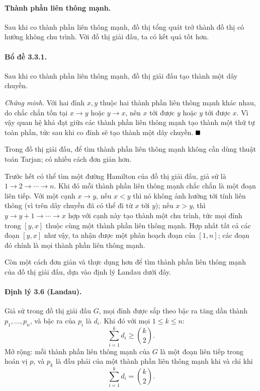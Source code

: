 \documentclass[11pt]{article}
\providecommand{\square}{\mathord{\vcenter{\hrule height .6em width .6em}}}
\begin{document}
\paragraph{Thành phần liên thông mạnh.}
Sau khi co thành phần liên thông mạnh, đồ thị tổng quát trở thành đồ thị có
hướng không chu trình. Với đồ thị giải đấu, ta có kết quả tốt hơn.

\paragraph{Bổ đề 3.3.1.}
Sau khi co thành phần liên thông mạnh, đồ thị giải đấu tạo thành một dây chuyền.

\emph{Chứng minh.}
Với hai đỉnh $x,y$ thuộc hai thành phần liên thông mạnh khác nhau, do chắc chắn
tồn tại $x\to y$ hoặc $y\to x$, nên $x$ tới được $y$ hoặc $y$ tới được $x$. Vì
vậy quan hệ khả đạt giữa các thành phần liên thông mạnh tạo thành một thứ tự
toàn phần, tức sau khi co đỉnh sẽ tạo thành một dây chuyền. \hfill$\square$

Trong đồ thị giải đấu, để tìm thành phần liên thông mạnh không cần dùng thuật
toán Tarjan; có nhiều cách đơn giản hơn.

Trước hết có thể tìm một đường Hamilton của đồ thị giải đấu, giả sử là
$1\to2\to\cdots\to n$. Khi đó mỗi thành phần liên thông mạnh chắc chắn là một
đoạn liên tiếp. Với một cạnh $x\to y$, nếu $x<y$ thì nó không ảnh hưởng tới tính
liên thông (vì trên dây chuyền đã có thể đi từ $x$ tới $y$); nếu $x>y$, thì
$y\to y+1\to\cdots\to x$ hợp với cạnh này tạo thành một chu trình, tức mọi đỉnh
trong $[y,x]$ thuộc cùng một thành phần liên thông mạnh. Hợp nhất tất cả các
đoạn $[y,x]$ như vậy, ta nhận được một phân hoạch đoạn của $[1,n]$; các đoạn đó
chính là mọi thành phần liên thông mạnh.

Còn một cách đơn giản và thực dụng hơn để tìm thành phần liên thông mạnh của đồ
thị giải đấu, dựa vào định lý Landau dưới đây.

\paragraph{Định lý 3.6 (Landau).}
Giả sử trong đồ thị giải đấu $G$, mọi đỉnh được sắp theo bậc ra tăng dần thành
$p_1,\ldots,p_n$, và bậc ra của $p_i$ là $d_i$. Khi đó với mọi
$1\le k\le n$:
\[
\sum_{i=1}^k d_i\ge \binom{k}{2}.
\]
Mở rộng: mỗi thành phần liên thông mạnh của $G$ là một đoạn liên tiếp trong hoán
vị $p$, và $p_k$ là đầu phải của một thành phần liên thông mạnh khi và chỉ khi
\[
\sum_{i=1}^k d_i=\binom{k}{2}.
\]
\end{document}
